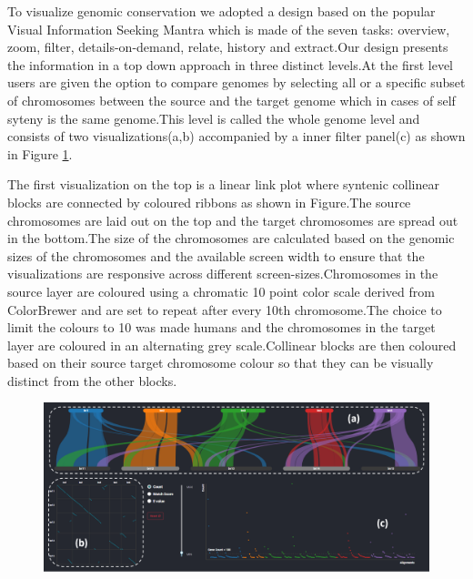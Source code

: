 To visualize genomic conservation we adopted a design based on the popular Visual Information Seeking Mantra \cite{Shneiderman96theeyes} which is made of the seven tasks: overview, zoom, filter, details-on-demand, relate, history and extract.Our design presents the information in a top down approach in three distinct levels.At the first level users are given the option to  compare genomes by selecting all or a specific subset of chromosomes between the source and the target genome which in cases of self syteny is the same genome.This level is called the whole genome level and consists of two visualizations(a,b) accompanied by a inner filter panel(c) as shown in Figure \ref{fig:ch_4_dashboard}. 




The first visualization on the top is a linear link plot where syntenic collinear blocks are connected by coloured ribbons as shown in Figure.The source chromosomes are laid out on the top and the target chromosomes are spread out in the bottom.The size of the chromosomes are calculated based on the genomic sizes of the chromosomes and the available screen width to ensure that the visualizations are responsive across different screen-sizes.Chromosomes in the source layer are coloured using a chromatic 10 point color scale derived from ColorBrewer\cite{colorbrewer} and are set to repeat after every 10th chromosome.The choice to limit the colours to 10 was made humans and the chromosomes in the target layer are coloured in an alternating grey scale.Collinear blocks are then coloured based on their source target chromosome colour so that they can be visually distinct from the other blocks.

\begin{figure}
  \centering
  \includegraphics[width=.75\linewidth]{images/ch_1_dashboard.PNG}
  \label{fig:ch_4_dashboard}
\end{figure}


